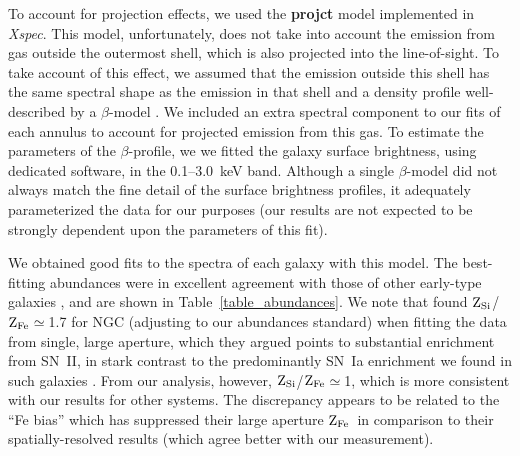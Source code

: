 \documentclass{emulateapj}
\def \eg {e.g.}
\newcommand{\zfe }{${\rm Z_{Fe}}$}
\newcommand{\zsi }{${\rm Z_{Si}}$}
\newcommand{\xspec }{{\em Xspec}}
\newcommand{\thin}{\thinspace}
\begin{document}
To account for projection effects, we used the {\bf projct} model implemented
in \xspec. This model, unfortunately, does not take into account the 
emission from gas outside the outermost shell, which is also projected
into the line-of-sight. To take account of this effect, we assumed that 
the emission outside this shell has the same spectral shape as the 
emission in that shell and a density profile well-described by a $\beta$-model
\citep[\eg][]{buote00c}.
We included an extra spectral component to our fits of each annulus to account
for projected emission from this gas.
To estimate the parameters of the $\beta$-profile, we 
we fitted the galaxy surface brightness, using dedicated software,
in the 0.1--3.0~keV band. Although a single $\beta$-model did not
always match the fine detail of the surface brightness profiles, it
adequately parameterized the data for our purposes (our results are
not expected to be strongly dependent upon the parameters of this fit). 


We obtained good fits to the spectra of each galaxy with this model.
The best-fitting abundances 
were in excellent agreement with those of other early-type galaxies
\citep{humphrey05a}, and are shown in Table~\ref{table_abundances}.
We note that \citet{randall05a} found \zsi/\zfe$\simeq$1.7 for
NGC\thin 4649 (adjusting to our abundances standard) when 
fitting the data  from single, large aperture, which they
argued points to substantial enrichment from SN~II, 
in stark contrast to the predominantly SN~Ia enrichment 
we found in such galaxies \citep{humphrey05a}. From our analysis,
however, \zsi/\zfe$\simeq$1, which is more 
consistent with our results for other systems. The discrepancy 
appears to be related to the ``Fe bias'' \citep[where \zfe\ is 
systematically underestimated if one assumes multi-temperature gas
is isothermal:][]{buote00c} which has suppressed their large aperture
\zfe\ in comparison to their spatially-resolved results (which
agree better with our measurement).
\end{document}
